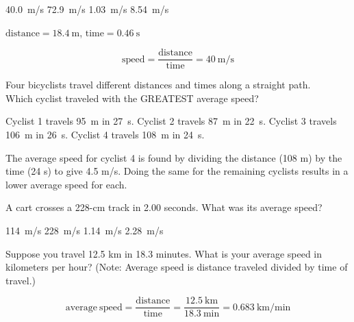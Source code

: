\documentclass[answers]{exam}
\begin{document}
\begin{questions}
\begin{questions}
\begin{choices}
\correctchoice \SI{40.0}{m/s}
\choice \SI{72.9}{m/s}
\choice \SI{1.03}{m/s}
\choice \SI{8.54}{m/s}
\end{choices}

\begin{solution}
    $\text{distance} = \SI{18.4}{\meter}$, $\text{time}=\SI{0.46}{\second}$

\begin{equation*}
    \text{speed} = \frac{\text{distance}}{\text{time}} = \SI{40}{\meter/\second}
\end{equation*}
\end{solution}

\question
Four bicyclists travel different distances and times along a straight path. \\
Which cyclist traveled with the GREATEST average speed?

\begin{choices}
\choice Cyclist 1 travels \SI{95}{m} in \SI{27}{s}.
\choice Cyclist 2 travels \SI{87}{m} in \SI{22}{s}.
\choice Cyclist 3 travels \SI{106}{m} in \SI{26}{s}.
\CorrectChoice Cyclist 4 travels \SI{108}{m} in \SI{24}{s}.
\end{choices}

\begin{solution}
The average speed for cyclist 4 is found by dividing the distance (108 m) by the time (24 s) to give 4.5 m/s. Doing the same for the remaining cyclists results in a lower average speed for each.
\end{solution}


\question
A cart crosses a 228-cm track in 2.00 seconds. What was its average speed?

\begin{choices}
    \choice \SI{114}{m/s}
    \choice \SI{228}{m/s}
    \correctchoice \SI{1.14}{m/s}
    \choice \SI{2.28}{m/s}
\end{choices}

\question
Suppose you travel 12.5 km in 18.3 minutes. What is your average speed in kilometers per hour? (Note: Average speed is distance traveled divided by time of travel.)

\begin{solution}
\begin{equation*}
    \mathrm{average\ speed = \frac{distance}{time}} = \frac{\SI{12.5}{\kilo\meter}}{\SI{18.3}{\minute}} = \SI[per-mode=fraction]{0.683}{\kilo\meter\per\minute}
\end{equation*}


\end{solution}
\end{questions}
\end{questions}
\end{document}
